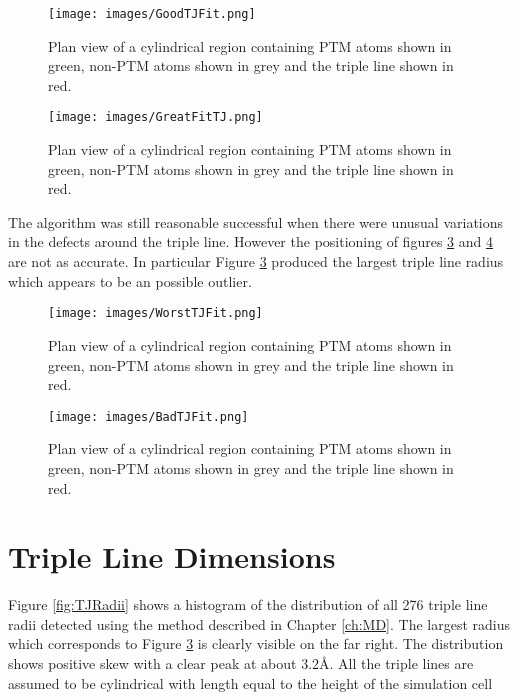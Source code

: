 \documentclass[12pt,a4paper,openany]{report}
\begin{document}
\begin{figure}[H]
	\centering
	\texttt{[image: images/GoodTJFit.png]} 
	\caption{Plan view of a cylindrical region containing PTM atoms shown in green, non-PTM atoms shown in grey and the triple line shown in red.}
	\label{fig:TJGoodFit}
\end{figure}

\begin{figure}[H]
	\centering
	\texttt{[image: images/GreatFitTJ.png]} 
	\caption{Plan view of a cylindrical region containing PTM atoms shown in green, non-PTM atoms shown in grey and the triple line shown in red.}
	\label{fig:GreatTJFit}
\end{figure}

The algorithm was still reasonable successful when there were unusual variations in the defects around the triple line. However the positioning of figures \ref{fig:WorstTJFit} and  \ref{fig:BadTJFit} are not as accurate. In particular Figure \ref{fig:WorstTJFit} produced the largest triple line radius which appears to be an possible outlier.  

\begin{figure}[H]
	\centering
	\texttt{[image: images/WorstTJFit.png]} 
	\caption{Plan view of a cylindrical region containing PTM atoms shown in green, non-PTM atoms shown in grey and the triple line shown in red.}
	\label{fig:WorstTJFit}
\end{figure}


\begin{figure}[H]
	\centering
	\texttt{[image: images/BadTJFit.png]} 
	\caption{Plan view of a cylindrical region containing PTM atoms shown in green, non-PTM atoms shown in grey and the triple line shown in red.}
	\label{fig:BadTJFit}
\end{figure}

\newpage
\section{Triple Line Dimensions}

Figure \ref{fig:TJRadii} shows a histogram of the distribution of all 276 triple line radii detected using the method described in Chapter \ref{ch:MD}. The largest radius which corresponds to Figure \ref{fig:WorstTJFit} is clearly visible on the far right. The distribution shows positive skew with a clear peak at about $3.2 \textrm{\AA}$. All the triple lines are assumed to be cylindrical with length equal to the height of the simulation cell
\end{document}
